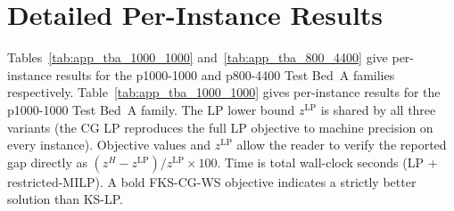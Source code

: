 \appendix

\section{Detailed Per-Instance Results}
\label{app:detail}

Tables~\ref{tab:app_tba_1000_1000} and~\ref{tab:app_tba_800_4400} give
per-instance results for the p1000-1000 and p800-4400 Test Bed~A families
respectively.
Table~\ref{tab:app_tba_1000_1000} gives per-instance results for the
p1000-1000 Test Bed~A family.
The LP lower bound $z^{\mathrm{LP}}$ is shared by all three variants (the CG LP
reproduces the full LP objective to machine precision on every instance).
Objective values and $z^{\mathrm{LP}}$ allow the reader to verify the reported
gap directly as $(z^H - z^{\mathrm{LP}})/z^{\mathrm{LP}} \times 100$.
Time is total wall-clock seconds (LP + restricted-MILP).
A bold FKS-CG-WS objective indicates a strictly better solution than KS-LP.

